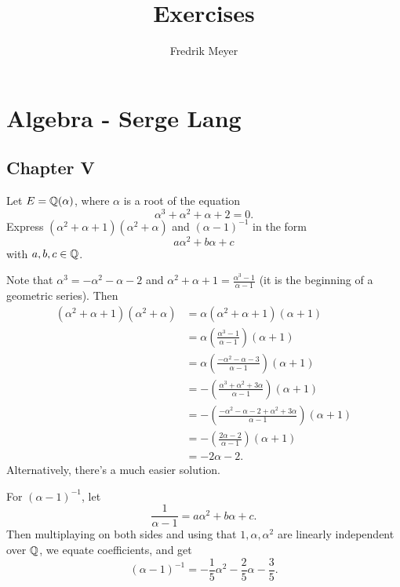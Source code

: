 \documentclass[11pt, english]{article}
\begin{document}
\title{Exercises}
\author{Fredrik Meyer}
\maketitle 

\tableofcontents 

\section{Algebra - Serge Lang}

\subsection{Chapter V}

\begin{exc}
 Let $E=\mathbb{Q}(\alpha)$, where $\alpha$ is a root of the equation
\[
\alpha^3+ \alpha^2+\alpha+2 = 0.
\]
Express $(\alpha^2+\alpha+1)(\alpha^2+\alpha)$ and $(\alpha-1)^{-1}$ in the form
\[
a\alpha^2+b\alpha + c 
\]
with $a,b,c \in \mathbb{Q}$.
\end{exc}

\begin{sol}
Note that $\alpha^3 = -\alpha^2-\alpha - 2$ and $\alpha^2+\alpha+1=\frac{\alpha^3-1}{\alpha-1}$ (it is the beginning of a geometric series). Then
\begin{align*}
(\alpha^2+\alpha+1)(\alpha^2+\alpha) &= \alpha(\alpha^2+\alpha+1)(\alpha+1) \\
&= \alpha \left(\frac{ \alpha^3 -1}{\alpha-1} \right) (\alpha+1) \\
&= \alpha \left( \frac{-\alpha^2-\alpha- 3}{\alpha-1} \right) (\alpha+1) \\
&= -\left( \frac{\alpha^3+\alpha^2+3\alpha}{\alpha-1} \right)(\alpha+1) \\
&= -\left( \frac{-\alpha^2-\alpha-2 + \alpha^2+3\alpha}{\alpha-1}\right) (\alpha+1) \\
&= -\left( \frac{2\alpha - 2}{\alpha-1} \right) (\alpha+1) \\
&= -2\alpha-2.
\end{align*}
Alternatively, there's a much easier solution.


For $(\alpha-1)^{-1}$, let 
\[
\frac{1}{\alpha-1} = a\alpha^2+b\alpha+ c.
\]
Then multiplaying on both sides and using that $1,\alpha, \alpha^2$ are linearly independent over $\mathbb{Q}$, we equate coefficients, and get
\[
(\alpha-1)^{-1} = -\frac 15 \alpha^2 -\frac 25 \alpha - \frac 35.
\]
\end{sol}
\end{document}
